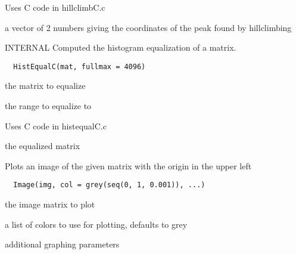 \documentclass[a4paper]{book}
\begin{document}
%
\begin{Details}\relax
Uses C code in hillclimbC.c
\end{Details}
%
\begin{Value}
a vector of 2 numbers giving the coordinates of the peak
found by hillclimbing
\end{Value}
%
\begin{Description}\relax
INTERNAL Computed the histogram equalization of a matrix.
\end{Description}
%
\begin{Usage}
\begin{verbatim}
  HistEqualC(mat, fullmax = 4096)
\end{verbatim}
\end{Usage}
%
\begin{Arguments}
\begin{ldescription}
\item[\code{mat}] the matrix to equalize

\item[\code{fullmax}] the range to equalize to
\end{ldescription}
\end{Arguments}
%
\begin{Details}\relax
Uses C code in histequalC.c
\end{Details}
%
\begin{Value}
the equalized matrix
\end{Value}
%
\begin{Description}\relax
Plots an image of the given matrix with the origin in the
upper left
\end{Description}
%
\begin{Usage}
\begin{verbatim}
  Image(img, col = grey(seq(0, 1, 0.001)), ...)
\end{verbatim}
\end{Usage}
%
\begin{Arguments}
\begin{ldescription}
\item[\code{img}] the image matrix to plot

\item[\code{col}] a list of colors to use for plotting, defaults
to grey

\item[\code{...}] additional graphing parameters
\end{ldescription}
\end{Arguments}
\end{document}
